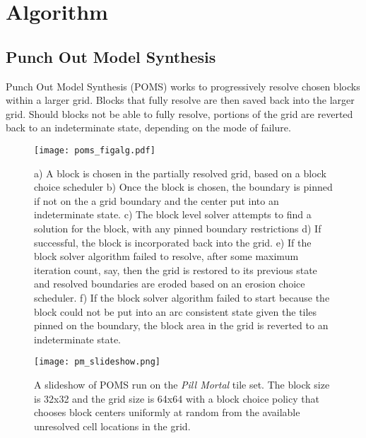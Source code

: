 \section{Algorithm}

\subsection{Punch Out Model Synthesis}

Punch Out Model Synthesis (POMS) works to progressively resolve chosen
blocks within a larger grid.
Blocks that fully resolve are then saved back into the larger grid.
Should blocks not be able to fully resolve, portions of the grid
are reverted back to an indeterminate state, depending on the mode of failure.

%  

\begin{figure*}[ht]
  \centering
  \texttt{[image: poms\_figalg.pdf]}
  \caption{a) A block is chosen in the partially resolved grid, based on a block choice scheduler
  b) Once the block is chosen, the boundary is pinned if not on the a grid boundary and the center put
  into an indeterminate state. c) The block level solver attempts to find a solution for the block,
  with any pinned boundary restrictions d) If successful, the block is incorporated back into the grid.
  e) If the block solver algorithm failed to resolve, after some maximum iteration count, say, then
  the grid is restored to its previous state and resolved boundaries are eroded based on an erosion
  choice scheduler. f) If the block solver algorithm failed to start because the block could not be
  put into an arc consistent state given the tiles pinned on the boundary, the block area in the grid is reverted
  to an indeterminate state.}
  \label{fig:alg}
\end{figure*}


\begin{figure*}[ht]
  \centering
  \texttt{[image: pm\_slideshow.png]}
  \caption{A slideshow of POMS run on the \textit{Pill Mortal} tile set. The block size is 32x32 and the grid size is 64x64 with a block choice policy that chooses block centers uniformly at random from the available unresolved cell locations in the grid. }
  \label{fig:pmrun}
\end{figure*}

